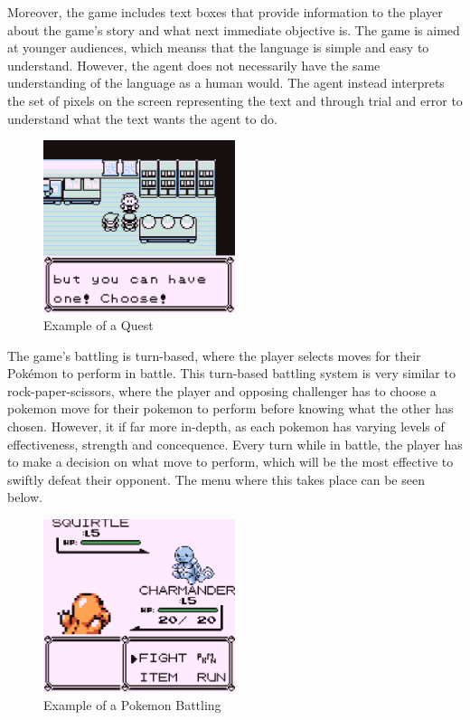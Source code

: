 Moreover, the game includes text boxes that provide information to the player about the game's story and what next immediate objective is. The game is aimed at younger audiences, which meanss that the language is simple and easy to understand. However, the agent does not necessarily have the same understanding of the language as a human would. The agent instead interprets the set of pixels on the screen representing the text and through trial and error to understand what the text wants the agent to do\cite{HubZ_1998}. 

\begin{figure}[H]
    \centering
    \includegraphics[width=0.5\textwidth]{figures/red_quest_example.png}
    \caption{Example of a Quest}
    \label{fig:pkmn_quest}
\end{figure}

The game's battling is turn-based, where the player selects moves for their Pokémon to perform in battle. This turn-based battling system is very similar to rock-paper-scissors, where the player and opposing challenger has to choose a pokemon move for their pokemon to perform before knowing what the other has chosen. However, it if far more in-depth, as each pokemon has varying levels of effectiveness, strength and concequence. Every turn while in battle, the player has to make a decision on what move to perform, which will be the most effective to swiftly defeat their opponent. The menu where this takes place can be seen below\cite{HubZ_1998}.

\begin{figure}[H]
    \centering
    \includegraphics[width=0.5\textwidth]{figures/red_battling.png}
    \caption{Example of a Pokemon Battling}
    \label{fig:pkmn_battling}
\end{figure}

